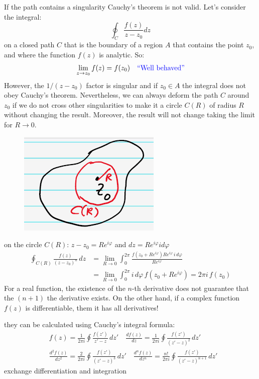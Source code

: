 \documentclass{article}
\begin{document}
\noindent
If the path contains a singularity Cauchy’s theorem is not valid. Let’s consider the integral:
\begin{equation}
    \oint_C \frac{f(z)}{z-z_0}dz
\end{equation}
on a closed path $C$ that is the boundary of a region $A$ that contains the point $z_0$, and where the function $f(z)$ is analytic. So:
\begin{equation}
    \lim_{z \rightarrow z_0} f(z) = f(z_0) \quad \color{blue}\text{``Well behaved''} \color{black}
\end{equation}
However, the $1/(z-z_0)$ factor is singular and if $z_0 \in A$ the integral does not obey Cauchy’s theorem. Nevertheless, we can always deform the path $C$ around $z_0$ if we do not cross other singularities to make it a circle $C(R)$ of radius $R$ without changing the result. Moreover, the result will not change taking the limit for $R \rightarrow 0$.
\begin{figure}[h]
    \centering
    \includegraphics[width=0.3\linewidth]{fig17.png}
\end{figure}

\noindent
on the circle $C(R)$: $z-z_0 = Re^{i\varphi}$ and $dz = Re^{i \varphi} id\varphi$
\begin{align}
    \oint_{C(R)} \frac{f(z)}{(z - z_0)^n} \, dz
&= \lim_{R \to 0} \int_{0}^{2\pi}
\frac{f(z_0 + R e^{i\varphi}) R e^{i\varphi} \, i \, d\varphi}{R e^{i\varphi}}\\
&= \lim_{R \to 0} \int_{0}^{2\pi} i \, d\varphi \, f(z_0 + R e^{i\varphi})
= 2\pi i \, f(z_0)
\end{align}
For a real function, the existence of the $n$-th derivative does not guarantee that the $(n+1)$ the derivative exists. On the other hand, if a complex function $f(z)$ is differentiable, them it has all derivatives!

\noindent
they can be calculated using Cauchy’s integral formula:
\begin{align*}
    &f(z) = \frac{1}{2\pi i} \oint \frac{f(z')}{z' - z} \, dz' \quad  \frac{d f(z)}{d z} = \frac{1}{2\pi i} \oint \frac{f(z')}{(z' - z)^2} \, dz'\\
    &\frac{d^2 f(z)}{d z^2} = \frac{2}{2\pi i} \oint \frac{f(z')}{(z' - z)^3} \, dz' \quad \frac{d^n f(z)}{d z^n} = \frac{n!}{2\pi i} \oint \frac{f(z')}{(z' - z)^{n+1}} \, dz'
\end{align*}
exchange differentiation and integration
\newpage
\end{document}
